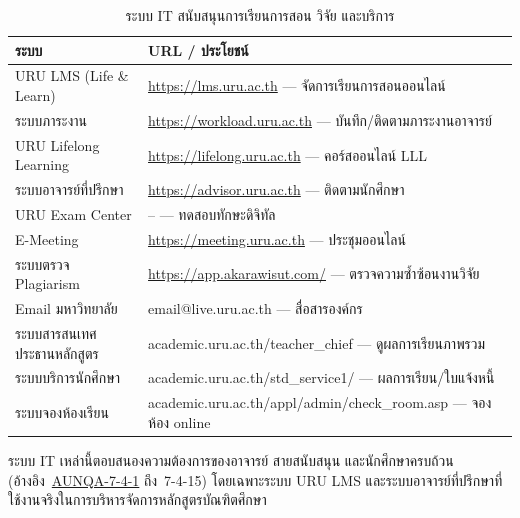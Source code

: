 \begin{table}[H]
  \centering
  \caption{ระบบ IT สนับสนุนการเรียนการสอน วิจัย และบริการ}
  \label{tbl:it_systems}
  \begingroup
  \footnotesize
  \setlength{\tabcolsep}{3pt}
  \renewcommand{\arraystretch}{1.2}
  \begin{tabularx}{\linewidth}{|>{\raggedright\arraybackslash}X|>{\raggedright\arraybackslash}X|}
    \hline
    \textbf{ระบบ} & \textbf{URL / ประโยชน์} \\
    \hline
    URU LMS (Life \& Learn) & \url{https://lms.uru.ac.th} --- จัดการเรียนการสอนออนไลน์ \\
    \hline
    ระบบภาระงาน & \url{https://workload.uru.ac.th} --- บันทึก/ติดตามภาระงานอาจารย์ \\
    \hline
    URU Lifelong Learning & \url{https://lifelong.uru.ac.th} --- คอร์สออนไลน์ LLL \\
    \hline
    ระบบอาจารย์ที่ปรึกษา & \url{https://advisor.uru.ac.th} --- ติดตามนักศึกษา \\
    \hline
    URU Exam Center & -- --- ทดสอบทักษะดิจิทัล \\
    \hline
    E-Meeting & \url{https://meeting.uru.ac.th} --- ประชุมออนไลน์ \\
    \hline
    ระบบตรวจ Plagiarism & \url{https://app.akarawisut.com/} --- ตรวจความซ้ำซ้อนงานวิจัย \\
    \hline
    Email มหาวิทยาลัย & email@live.uru.ac.th --- สื่อสารองค์กร \\
    \hline
    ระบบสารสนเทศประธานหลักสูตร & academic.uru.ac.th/teacher\_chief --- ดูผลการเรียนภาพรวม \\
    \hline
    ระบบบริการนักศึกษา & academic.uru.ac.th/std\_service1/ --- ผลการเรียน/ใบแจ้งหนี้ \\
    \hline
    ระบบจองห้องเรียน & academic.uru.ac.th/appl/admin/check\_room.asp --- จองห้อง online \\
    \hline
  \end{tabularx}
  \endgroup
\end{table}

ระบบ IT เหล่านี้ตอบสนองความต้องการของอาจารย์ สายสนับสนุน และนักศึกษาครบถ้วน (อ้างอิง~\hyperlink{ref:AUNQA-7-4-1}{AUNQA-7-4-1} ถึง~7-4-15) โดยเฉพาะระบบ URU LMS และระบบอาจารย์ที่ปรึกษาที่ใช้งานจริงในการบริหารจัดการหลักสูตรบัณฑิตศึกษา


